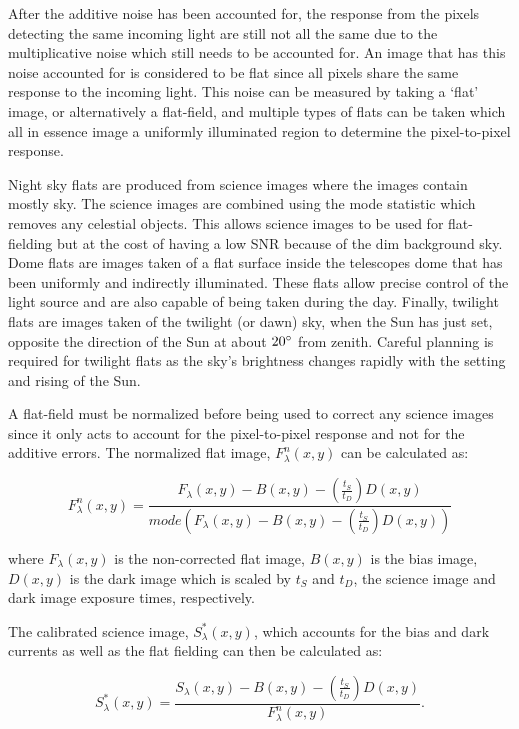 After the additive noise has been accounted for, the response from the pixels detecting the same incoming light are still not all the same due to the multiplicative noise which still needs to be accounted for. An image that has this noise accounted for is considered to be flat since all pixels share the same response to the incoming light. This noise can be measured by taking a `flat' image, or alternatively a flat-field, and multiple types of flats can be taken which all in essence image a uniformly illuminated region to determine the pixel-to-pixel response.
\prgph

Night sky flats are produced from science images where the images contain mostly sky. The science images are combined using the mode statistic which removes any celestial objects. This allows science images to be used for flat-fielding but at the cost of having a low \gls{SNR} because of the dim background sky. Dome flats are images taken of a flat surface inside the telescopes dome that has been uniformly and indirectly illuminated. These flats allow precise control of the light source and are also capable of being taken during the day. Finally, twilight flats are images taken of the twilight (or dawn) sky, when the Sun has just set, opposite the direction of the Sun at about $20\hbox{$^\circ$}$ from zenith. Careful planning is required for twilight flats as the sky's brightness changes rapidly with the setting and rising of the Sun.
\prgph

A flat-field must be normalized before being used to correct any science images since it only acts to account for the pixel-to-pixel response and not for the additive errors. The normalized flat image, $F^{n}_{\lambda}(x,y)$ can be calculated as:

\begin{equation}
    F^{n}_{\lambda}(x,y) = \frac{F_{\lambda}(x,y) - B(x,y) - (\frac{t_{S}}{t_{D}})D(x,y)}{mode(F_{\lambda}(x,y) - B(x,y) - (\frac{t_{S}}{t_{D}})D(x,y))}
    \label{eq:norm_flat}
\end{equation}

\noindent where $F_{\lambda}(x,y)$ is the non-corrected flat image, $B(x,y)$ is the bias image, $D(x,y)$ is the dark image which is scaled by $t_{S}$ and $t_{D}$, the science image and dark image exposure times, respectively.
\prgph

The calibrated science image, $S^{*}_{\lambda}(x,y)$, which accounts for the bias and dark currents as well as the flat fielding can then be calculated as:

\begin{equation}
    S^{*}_{\lambda}(x,y) = \frac{S_{\lambda}(x,y) - B(x,y) - (\frac{t_{S}}{t_{D}})D(x,y)}{F^{n}_{\lambda}(x,y)}.
    \label{eq:science_cal}
\end{equation}

